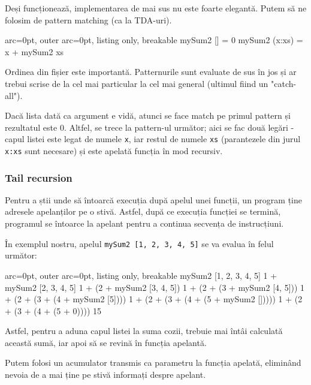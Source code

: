 Deși funcționează, implementarea de mai sus nu este foarte elegantă. Putem să ne folosim de pattern matching (ca la TDA-uri).


\begin{tcblisting}{ arc=0pt, outer arc=0pt, listing only, breakable}
mySum2 [] = 0
mySum2 (x:xs) = x + mySum2 xs

\end{tcblisting}


\begin{tcolorbox}[colback=yellow!40, colframe=yellow!60, breakable]
Ordinea din fișier este importantă. Patternurile sunt evaluate de sus în jos și ar trebui scrise de la cel mai particular la cel mai general (ultimul fiind un "catch-all").
\end{tcolorbox}

Dacă lista dată ca argument e vidă, atunci se face match pe primul pattern și rezultatul este 0. Altfel, se trece la pattern-ul următor; aici se fac două legări - capul listei este legat de numele \texttt{x}, iar restul de numele \texttt{xs} (parantezele din jurul \texttt{x:xs} sunt necesare) și este apelată funcția în mod recursiv.


\subsubsection*{ Tail recursion }

Pentru a știi unde să întoarcă execuția după apelul unei funcții, un program ține adresele apelanților pe o stivă.
Astfel, după ce execuția funcției se termină, programul se întoarce la apelant pentru a continua secvența de instrucțiuni.

În exemplul nostru, apelul \texttt{mySum2 [1, 2, 3, 4, 5]} se va evalua în felul următor:

\begin{tcblisting}{ arc=0pt, outer arc=0pt, listing only, breakable}
mySum2 [1, 2, 3, 4, 5]
1 + mySum2 [2, 3, 4, 5]
1 + (2 + mySum2 [3, 4, 5])
1 + (2 + (3 + mySum2 [4, 5]))
1 + (2 + (3 + (4 + mySum2 [5])))
1 + (2 + (3 + (4 + (5 + mySum2 []))))
1 + (2 + (3 + (4 + (5 + 0))))
15

\end{tcblisting}


Astfel, pentru a aduna capul listei la suma cozii, trebuie mai întâi calculată această sumă, iar apoi să se revină în funcția apelantă.

Putem folosi un acumulator transmis ca parametru la funcția apelată, eliminând nevoia de a mai ține pe stivă informați despre apelant.

